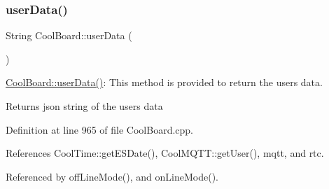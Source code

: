 \subsubsection{\texorpdfstring{user\+Data()}{userData()}}
{\footnotesize\ttfamily String Cool\+Board\+::user\+Data (\begin{DoxyParamCaption}{ }\end{DoxyParamCaption})}

\hyperlink{classCoolBoard_ae7358fb6e623cfc81b775f5f1734909b}{Cool\+Board\+::user\+Data()}\+: This method is provided to return the user\textquotesingle{}s data.

\begin{DoxyReturn}{Returns}
json string of the user\textquotesingle{}s data 
\end{DoxyReturn}


Definition at line 965 of file Cool\+Board.\+cpp.



References Cool\+Time\+::get\+E\+S\+Date(), Cool\+M\+Q\+T\+T\+::get\+User(), mqtt, and rtc.



Referenced by off\+Line\+Mode(), and on\+Line\+Mode().


